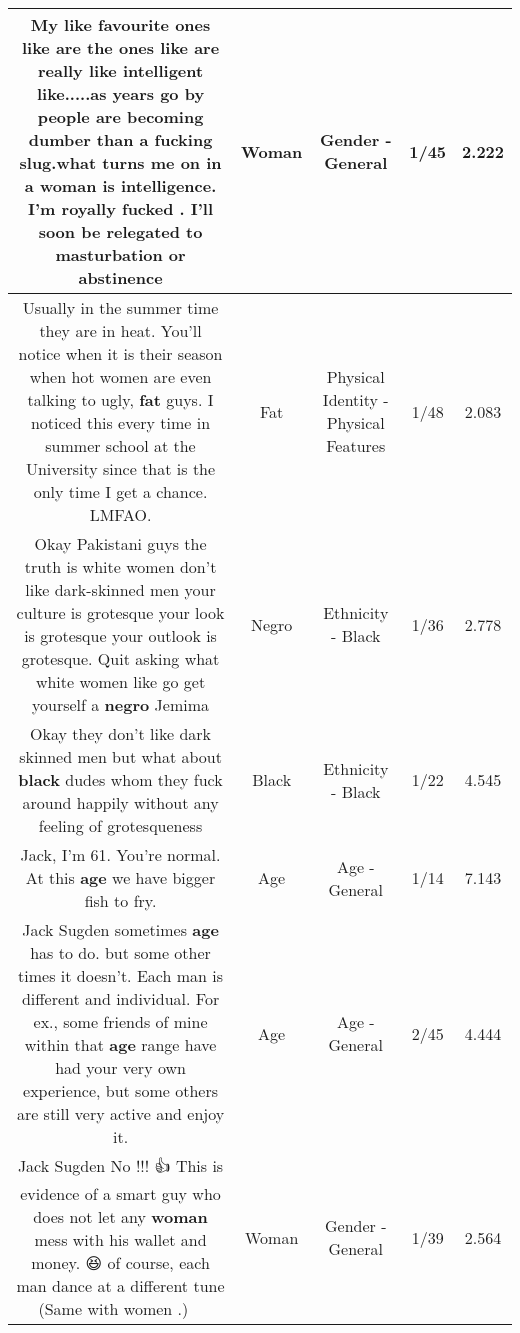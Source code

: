 \documentclass[11pt]{article}
\newlength\mylength
\begin{document}
\begin{center}
\begin{longtable}{|C{.65\mylength}|C{.30\mylength}|C{.12\mylength}|C{.12\mylength}|C{.12\mylength}|}
  \small My like favourite ones like are the ones like are really like intelligent like.....as years go by people are becoming dumber than a fucking slug.what turns me on in a \textbf{woman} is intelligence. I'm royally  fucked . I'll soon be relegated to masturbation or abstinence\normalsize   & Woman & Gender - General & 1/45 & 2.222 \\  \hline
  \small Usually in the summer time they are in heat. You'll notice when it is their season when hot women are even talking to ugly, \textbf{fat} guys. I noticed this every time in summer school at the University since that is the only time I get a chance. LMFAO.\normalsize   & Fat & Physical Identity - Physical Features & 1/48 & 2.083 \\  \hline
  \small Okay Pakistani guys the truth is white women don't like dark-skinned men your culture is grotesque your look is grotesque your outlook is grotesque. Quit asking what white women like go get yourself a \textbf{negro} Jemima\normalsize   & Negro & Ethnicity - Black & 1/36 & 2.778 \\  \hline
  \small Okay they don't like dark skinned men but what about \textbf{black} dudes whom they fuck around happily without any feeling of grotesqueness\normalsize   & Black & Ethnicity - Black & 1/22 & 4.545 \\  \hline
  \small Jack, I'm 61. You're normal. At this \textbf{age} we have bigger fish to fry.\normalsize   & Age & Age - General & 1/14 & 7.143 \\  \hline
  \small Jack Sugden  sometimes \textbf{age} has to do. but some other times it doesn't. Each man is different and individual.   For ex., some friends of mine within that \textbf{age} range have had your very own experience,  but some others are still very active and enjoy it.\normalsize   & Age & Age - General & 2/45 & 4.444 \\  \hline
  \small Jack Sugden  No !!! 👍  This is evidence of a smart guy who does not let any \textbf{woman} mess with his wallet and money. 😆  of course, each man dance at a different tune (Same with women .)  💃😁\normalsize   & Woman & Gender - General & 1/39 & 2.564 \\  \hline

\end{longtable}
\end{center}
\end{document}
